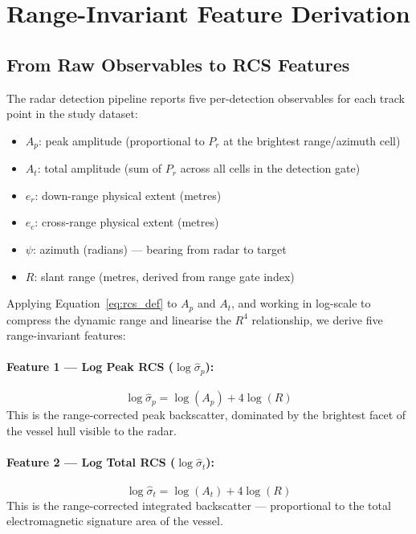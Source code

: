 \documentclass[journal]{IEEEtran}
\begin{document}
\section{Range-Invariant Feature Derivation}
\label{sec:features}

\subsection{From Raw Observables to RCS Features}

The radar detection pipeline reports five per-detection observables for
each track point in the study dataset:
\begin{itemize}
  \item $A_p$: peak amplitude (proportional to $P_r$ at the brightest
        range/azimuth cell)
  \item $A_t$: total amplitude (sum of $P_r$ across all cells in the
        detection gate)
  \item $e_r$: down-range physical extent (metres)
  \item $e_c$: cross-range physical extent (metres)
  \item $\psi$: azimuth (radians) — bearing from radar to target
  \item $R$: slant range (metres, derived from range gate index)
\end{itemize}

Applying Equation~\ref{eq:rcs_def} to $A_p$ and $A_t$, and working in
log-scale to compress the dynamic range and linearise the $R^4$
relationship, we derive five range-invariant features:

\paragraph{Feature 1 — Log Peak RCS ($\log\hat{\sigma}_p$):}
\begin{equation}
  \log\hat{\sigma}_p = \log(A_p) + 4\log(R)
  \label{eq:logpeak}
\end{equation}
This is the range-corrected peak backscatter, dominated by the
brightest facet of the vessel hull visible to the radar.

\paragraph{Feature 2 — Log Total RCS ($\log\hat{\sigma}_t$):}
\begin{equation}
  \log\hat{\sigma}_t = \log(A_t) + 4\log(R)
  \label{eq:logtotal}
\end{equation}
This is the range-corrected integrated backscatter — proportional to
the total electromagnetic signature area of the vessel.
\end{document}
